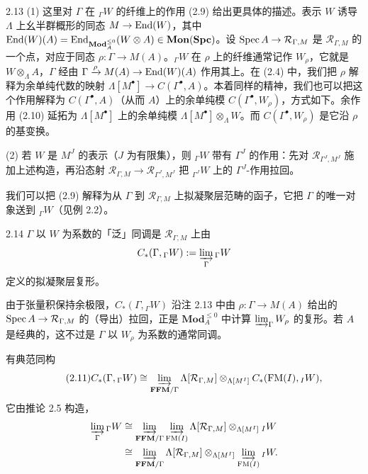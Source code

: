 \begin{rem}{2.13}\label{rem:a2-2-13}
(1) 这里对 $\Gamma$ 在 ${}_\Gamma W$ 的纤维上的作用 (2.9) 给出更具体的描述。表示 $W$ 诱导 $\Lambda$ 上幺半群概形的同态 $M\to\operatorname{End}(W)$，其中 $\operatorname{End}(W)(A)=\operatorname{End}_{\mathbf{Mod}_A^{\le 0}}(W\otimes A)\in\mathbf{Mon}(\mathbf{Spc})$。设 $\operatorname{Spec} A\to\mathcal R_{\Gamma,M}$ 是 $\mathcal R_{\Gamma,M}$ 的一个点，对应于同态 $\rho:\Gamma\to M(A)$。${}_\Gamma W$ 在 $\rho$ 上的纤维通常记作 $W_\rho$，它就是 $W\otimes_\Lambda A$，$\Gamma$ 经由 $\Gamma\xrightarrow{\rho}M(A)\to\operatorname{End}(W)(A)$ 作用其上。在 (2.4) 中，我们把 $\rho$ 解释为余单纯代数的映射 $\Lambda[M^\bullet]\to C(\Gamma^\bullet,A)$。本着同样的精神，我们也可以把这个作用解释为 $C(\Gamma^\bullet,A)$（从而 $A$）上的余单纯模 $C(\Gamma^\bullet,W_\rho)$，方式如下。余作用 (2.10) 延拓为 $\Lambda[M^\bullet]$ 上的余单纯模 $\Lambda[M^\bullet]\otimes_\Lambda W$。而 $C(\Gamma^\bullet,W_\rho)$ 是它沿 $\rho$ 的基变换。

(2) 若 $W$ 是 $M^J$ 的表示（$J$ 为有限集），则 ${}_\Gamma W$ 带有 $\Gamma^J$ 的作用：先对 $\mathcal R_{\Gamma^J,M^J}$ 施加上述构造，再沿态射 $\mathcal R_{\Gamma,M}\to\mathcal R_{\Gamma^J,M^J}$ 把 ${}_{\Gamma^J}W$ 上的 $\Gamma^J$-作用拉回。
\end{rem}

我们可以把 (2.9) 解释为从 $\Gamma$ 到 $\mathcal R_{\Gamma,M}$ 上拟凝聚层范畴的函子，它把 $\Gamma$ 的唯一对象送到 ${}_\Gamma W$（见例 2.2）。

\begin{defn}{2.14}\label{defn:a2-2-14}
$\Gamma$ 以 $W$ 为系数的「泛」同调是 $\mathcal R_{\Gamma,M}$ 上由
\[
C_*(\Gamma,{}_\Gamma W):=\varinjlim_\Gamma{}_\Gamma W
\]
定义的拟凝聚层复形。
\end{defn}

由于张量积保持余极限，$C_*(\Gamma,{}_\Gamma W)$ 沿注 2.13 中由 $\rho:\Gamma\to M(A)$ 给出的 $\operatorname{Spec} A\to\mathcal R_{\Gamma,M}$ 的（导出）拉回，正是 $\mathbf{Mod}_A^{\le 0}$ 中计算 $\varinjlim_\Gamma W_\rho$ 的复形。若 $A$ 是经典的，这不过是 $\Gamma$ 以 $W_\rho$ 为系数的通常同调。

有典范同构
\begin{equation}\tag{2.11}
C_*(\Gamma,{}_\Gamma W)\cong\varinjlim_{\mathbf{FFM}/\Gamma}\Lambda[\mathcal R_{\Gamma,M}]\otimes_{\Lambda[M^I]}C_*(\mathrm{FM}(I),{}_I W),
\end{equation}
它由推论 2.5 构造，
\begin{align*}
\varinjlim_\Gamma{}_\Gamma W&\cong\varinjlim_{\mathbf{FFM}/\Gamma}\varinjlim_{\mathrm{FM}(I)}\Lambda[\mathcal R_{\Gamma,M}]\otimes_{\Lambda[M^I]}{}_I W\\
&\cong\varinjlim_{\mathbf{FFM}/\Gamma}\Lambda[\mathcal R_{\Gamma,M}]\otimes_{\Lambda[M^I]}\varinjlim_{\mathrm{FM}(I)}{}_I W .
\end{align*}

